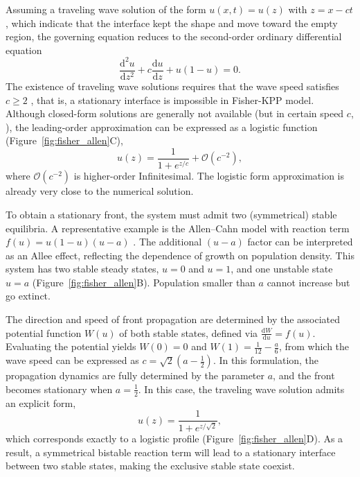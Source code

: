         Assuming a traveling wave solution of the form $u(x,t) = u(z)$ with $z = x - ct$ \citep{fife_approach_1977}, which indicate that the interface kept the shape and move toward the empty region, the governing equation reduces to the second-order ordinary differential equation
        \begin{equation*}
            \frac{\mathrm{d}^2 u}{\mathrm{d} z^2} + c \frac{\mathrm{d} u}{\mathrm{d} z} + u(1-u) = 0.
        \end{equation*}
        The existence of traveling wave solutions requires that the wave speed satisfies $c \geq 2$ \citep{fisher_wave_1937,breuer_fluctuation_1994}, that is, a stationary interface is impossible in Fisher-KPP model. Although closed-form solutions are generally not available (but in certain speed $c$, \citet{ablowitz_explicit_1979}), the leading-order approximation can be expressed as a logistic function (Figure~\ref{fig:fisher_allen}C),
        \begin{equation}
            u(z) = \frac{1}{1 + e^{z/c}} + \mathcal{O}(c^{-2}),
        \end{equation}
        where $\mathcal{O}(c^{-2})$ is higher-order Infinitesimal. The logistic form approximation is already very close to the numerical solution.

        To obtain a stationary front, the system must admit two (symmetrical) stable equilibria. A representative example is the Allen--Cahn model \citep{cahn_free_1958} with reaction term $f(u) = u(1-u)(u-a)$ \citep{simpson_fisherkpp-type_2024}. The additional $(u-a)$ factor can be interpreted as an Allee effect, reflecting the dependence of growth on population density. This system has two stable steady states, $u=0$ and $u=1$, and one unstable state $u=a$ (Figure~\ref{fig:fisher_allen}B). Population smaller than $a$ cannot increase but go extinct.

        The direction and speed of front propagation are determined by the associated potential function $W(u)$ of both stable states, defined via $\frac{\mathrm{d} W}{\mathrm{d} u} = f(u)$. Evaluating the potential yields $W(0)=0$ and $W(1)=\frac{1}{12} - \frac{a}{6}$, from which the wave speed can be expressed as $c = \sqrt{2}\left(a - \frac{1}{2}\right)$. In this formulation, the propagation dynamics are fully determined by the parameter $a$, and the front becomes stationary when $a = \frac{1}{2}$. In this case, the traveling wave solution admits an explicit form,
        \begin{equation}
            u(z) = \frac{1}{1 + e^{z/\sqrt{2}}},
        \end{equation}
        which corresponds exactly to a logistic profile (Figure~\ref{fig:fisher_allen}D). As a result, a symmetrical bistable reaction term will lead to a stationary interface between two stable states, making the exclusive stable state coexist.

